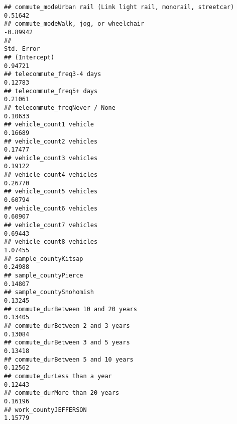 \documentclass[
]{article}
\begin{document}
\begin{verbatim}
## commute_modeUrban rail (Link light rail, monorail, streetcar)                                0.51642
## commute_modeWalk, jog, or wheelchair                                                        -0.89942
##                                                                                             Std. Error
## (Intercept)                                                                                    0.94721
## telecommute_freq3-4 days                                                                       0.12783
## telecommute_freq5+ days                                                                        0.21061
## telecommute_freqNever / None                                                                   0.10633
## vehicle_count1 vehicle                                                                         0.16689
## vehicle_count2 vehicles                                                                        0.17477
## vehicle_count3 vehicles                                                                        0.19122
## vehicle_count4 vehicles                                                                        0.26770
## vehicle_count5 vehicles                                                                        0.60794
## vehicle_count6 vehicles                                                                        0.60907
## vehicle_count7 vehicles                                                                        0.69443
## vehicle_count8 vehicles                                                                        1.07455
## sample_countyKitsap                                                                            0.24988
## sample_countyPierce                                                                            0.14807
## sample_countySnohomish                                                                         0.13245
## commute_durBetween 10 and 20 years                                                             0.13405
## commute_durBetween 2 and 3 years                                                               0.13084
## commute_durBetween 3 and 5 years                                                               0.13418
## commute_durBetween 5 and 10 years                                                              0.12562
## commute_durLess than a year                                                                    0.12443
## commute_durMore than 20 years                                                                  0.16196
## work_countyJEFFERSON                                                                           1.15779

\end{verbatim}
\end{document}
